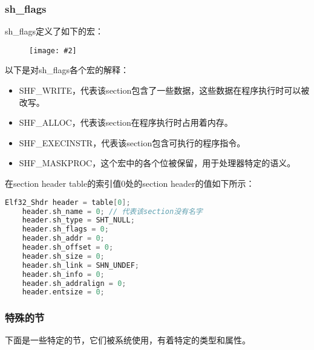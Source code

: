 \documentclass[a4paper,left=2.5cm,right=2.5cm,11pt]{article}
\newcommand{\sizedfic}[2]{\begin{figure}[H]
		\center
		\texttt{[image: \#2]}
	\end{figure}}
\begin{document}
	\vspace{1em}

\subsubsection{sh\_flags}

	sh\_flags定义了如下的宏：
	\sizedfic{0.4}{17.png}

	以下是对sh\_flags各个宏的解释：
	\begin{itemize}
		\item SHF\_WRITE，代表该section包含了一些数据，这些数据在程序执行时可以被改写。
		\item SHF\_ALLOC，代表该section在程序执行时占用着内存。
		\item SHF\_EXECINSTR，代表该section包含可执行的程序指令。
		\item SHF\_MASKPROC，这个宏中的各个位被保留，用于处理器特定的语义。
	\end{itemize}

	在section header table的索引值0处的section header的值如下所示：
	\begin{lstlisting}[language = C]
	Elf32_Shdr header = table[0];
	header.sh_name = 0; // 代表该section没有名字
	header.sh_type = SHT_NULL;
	header.sh_flags = 0;
	header.sh_addr = 0;
	header.sh_offset = 0;
	header.sh_size = 0;
	header.sh_link = SHN_UNDEF;
	header.sh_info = 0;
	header.sh_addralign = 0;
	header.entsize = 0;
	\end{lstlisting}

\subsubsection{特殊的节}
	下面是一些特定的节，它们被系统使用，有着特定的类型和属性。
	\vspace{0.5em}
\end{document}
